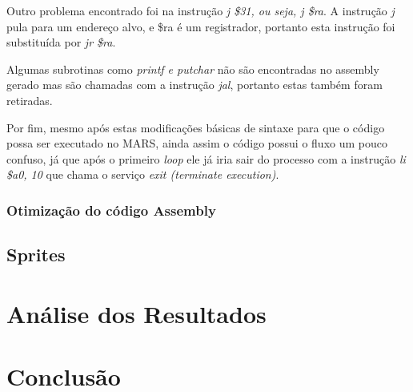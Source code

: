 \documentclass[12pt]{article}
\begin{document}
Outro problema encontrado foi na instrução \textit{j \$31, ou seja, j \$ra}. A instrução \textit{j} pula para um endereço alvo, e \$ra é um registrador, portanto esta instrução foi substituída por \textit{jr \$ra}.

Algumas subrotinas como \textit{printf e putchar} não são encontradas no assembly gerado mas são chamadas com a instrução \textit{jal}, portanto estas também foram retiradas.

Por fim, mesmo após estas modificações básicas de sintaxe para que o código possa ser executado no MARS, ainda assim o código possui o fluxo um pouco confuso, já que após o primeiro \textit{loop} ele já iria sair do processo com a instrução \textit{li \$a0, 10} que chama o serviço \textit{exit (terminate execution)}.

\subsubsection{Otimização do código Assembly}
\label{subsubsec:ot}

\subsection{Sprites}
\label{subsec:sprites}

\section{Análise dos Resultados}
\label{sec:Resultados}

\section{Conclusão}
\label{sec:Conclusao}


  
\end{document}

